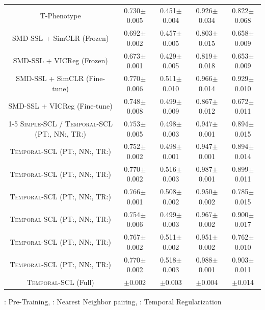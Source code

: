 \documentclass[pmlr,twocolumn,10pt]{jmlr} %
\newcommand{\cbmark}{\ding{51}}
\newcommand{\xbmark}{\ding{55}}
\newcommand{\bftab}{\fontseries{b}\selectfont}
\begin{document}
\begin{table}[t]
{\begin{tabular}{ccccc}
                        T-Phenotype                            & 0.730$\pm$0.005            & 0.451$\pm$0.004         & 0.926$\pm$0.034          & 0.822$\pm$0.068 \\
                        SMD-SSL + SimCLR (Frozen)              & 0.692$\pm$0.002	        & 0.457$\pm$0.005	      & 0.803$\pm$0.015	         & 0.658$\pm$0.009 \\
                        SMD-SSL + VICReg (Frozen)              & 0.673$\pm$0.001	        & 0.429$\pm$0.005	      & 0.819$\pm$0.018	         & 0.653$\pm$0.009 \\
                        SMD-SSL + SimCLR (Fine-tune)           & 0.770$\pm$0.006	        & 0.511$\pm$0.010	      & 0.966$\pm$0.014	         & 0.929$\pm$0.010 \\
                        SMD-SSL + VICReg (Fine-tune)           & 0.748$\pm$0.008	        & 0.499$\pm$0.009	      & 0.867$\pm$0.012	         & 0.672$\pm$0.011 \\
                        \cmidrule(lr){1-5}
\textsc{Simple-SCL} / \textsc{Temporal-SCL} (PT:\xbmark, NN:\xbmark, TR:\xbmark)                                          & 0.753$\pm$0.005            & 0.498$\pm$0.003         & 0.947$\pm$0.001          & 0.894$\pm$0.015 \\
\textsc{Temporal-SCL} (PT:\cbmark, NN:\xbmark, TR:\xbmark)    & 0.752$\pm$0.002            & 0.498$\pm$0.001         & 0.947$\pm$0.001          & 0.894$\pm$0.014 \\
\textsc{Temporal-SCL} (PT:\xbmark, NN:\cbmark, TR:\xbmark)    & 0.770$\pm$0.002            & 0.516$\pm$0.003         & 0.987$\pm$0.001          & 0.899$\pm$0.011 \\
\textsc{Temporal-SCL} (PT:\xbmark, NN:\xbmark, TR:\cbmark)    & 0.766$\pm$0.001            & 0.508$\pm$0.002         & 0.950$\pm$0.002          & 0.785$\pm$0.015 \\
\textsc{Temporal-SCL} (PT:\xbmark, NN:\cbmark, TR:\cbmark)    & 0.754$\pm$0.006            & 0.499$\pm$0.003         & 0.967$\pm$0.002          & 0.900$\pm$0.017 \\ 
\textsc{Temporal-SCL} (PT:\cbmark, NN:\xbmark, TR:\cbmark)    & 0.767$\pm$0.002            & 0.511$\pm$0.002         & 0.951$\pm$0.002          & 0.762$\pm$0.010 \\
\textsc{Temporal-SCL} (PT:\cbmark, NN:\cbmark, TR:\xbmark)    & 0.770$\pm$0.002            & 0.518$\pm$0.003         & 0.988$\pm$0.001          & 0.903$\pm$0.011 \\
                        \textsc{Temporal-SCL} (Full)          & {\bftab 0.773$\pm$0.002}   &{\bftab 0.520$\pm$0.003} & {\bftab 0.990$\pm$0.004} & {\bftab 0.936$\pm$0.014} \\ 
\bottomrule
\end{tabular}}

\vspace{.5ex}
{\scriptsize {\bftab{PT}}: Pre-Training, {\bftab{NN}}: Nearest Neighbor pairing, {\bftab{TR}}: Temporal Regularization\\}
\label{tab:results}
\vspace{-1em}
\end{table}
\end{document}

